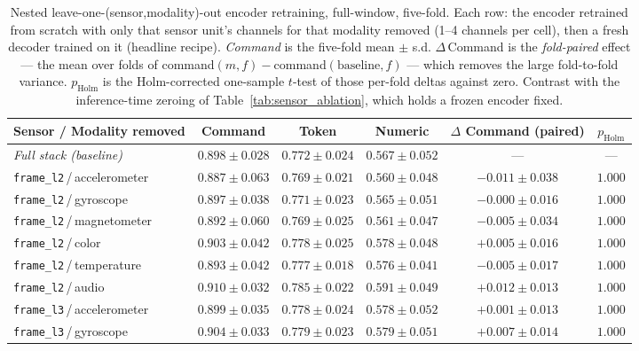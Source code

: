 \begin{table}[ht]
\centering
\caption{Nested leave-one-(sensor,modality)-out encoder retraining, full-window, five-fold. Each row: the encoder retrained from scratch with only that sensor unit's channels for that modality removed (1--4 channels per cell), then a fresh decoder trained on it (headline recipe). \emph{Command} is the five-fold mean $\pm$ s.d. $\Delta$\,Command is the \emph{fold-paired} effect --- the mean over folds of command$(m,f)-$command$(\text{baseline},f)$ --- which removes the large fold-to-fold variance. $p_{\text{Holm}}$ is the Holm-corrected one-sample $t$-test of those per-fold deltas against zero. Contrast with the inference-time zeroing of Table~\ref{tab:sensor_ablation}, which holds a frozen encoder fixed.}
\label{tab:lomo_nested}
\footnotesize
\setlength{\tabcolsep}{3pt}
\begin{tabular}{l c c c c c}
\toprule
\textbf{Sensor / Modality removed} & \textbf{Command} & \textbf{Token} & \textbf{Numeric} & \textbf{$\Delta$ Command (paired)} & \textbf{$p_{\text{Holm}}$} \\
\midrule
\textit{Full stack (baseline)} & $0.898 \pm 0.028$ & $0.772 \pm 0.024$ & $0.567 \pm 0.052$ & --- & --- \\
\texttt{frame\_l2}\,/\,accelerometer & $0.887 \pm 0.063$ & $0.769 \pm 0.021$ & $0.560 \pm 0.048$ & $-0.011 \pm 0.038$ & $1.000$ \\
\texttt{frame\_l2}\,/\,gyroscope & $0.897 \pm 0.038$ & $0.771 \pm 0.023$ & $0.565 \pm 0.051$ & $-0.000 \pm 0.016$ & $1.000$ \\
\texttt{frame\_l2}\,/\,magnetometer & $0.892 \pm 0.060$ & $0.769 \pm 0.025$ & $0.561 \pm 0.047$ & $-0.005 \pm 0.034$ & $1.000$ \\
\texttt{frame\_l2}\,/\,color & $0.903 \pm 0.042$ & $0.778 \pm 0.025$ & $0.578 \pm 0.048$ & $+0.005 \pm 0.016$ & $1.000$ \\
\texttt{frame\_l2}\,/\,temperature & $0.893 \pm 0.042$ & $0.777 \pm 0.018$ & $0.576 \pm 0.041$ & $-0.005 \pm 0.017$ & $1.000$ \\
\texttt{frame\_l2}\,/\,audio & $0.910 \pm 0.032$ & $0.785 \pm 0.022$ & $0.591 \pm 0.049$ & $+0.012 \pm 0.013$ & $1.000$ \\
\texttt{frame\_l3}\,/\,accelerometer & $0.899 \pm 0.035$ & $0.778 \pm 0.024$ & $0.578 \pm 0.052$ & $+0.001 \pm 0.013$ & $1.000$ \\
\texttt{frame\_l3}\,/\,gyroscope & $0.904 \pm 0.033$ & $0.779 \pm 0.023$ & $0.579 \pm 0.051$ & $+0.007 \pm 0.014$ & $1.000$ \\

\end{tabular}
\end{table}
